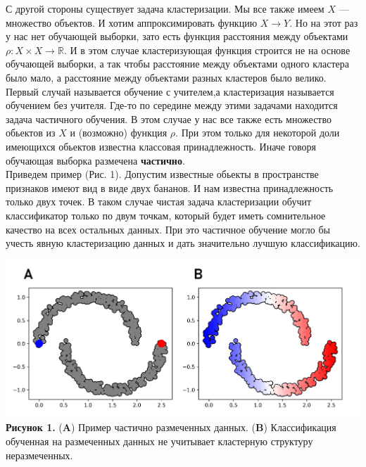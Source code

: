 С другой стороны существует задача кластеризации. Мы все также имеем $X$ --- множество объектов. И хотим аппроксимировать функцию $X \longrightarrow Y$. Но на этот раз у нас нет обучающей выборки, зато есть функция расстояния между объектами $\rho: X\times X \longrightarrow \mathbb{R}$. И в этом случае кластеризующая функция строится не на основе обучающей выборки, а так чтобы расстояние между объектами одного кластера было мало, а расстояние между объектами разных кластеров было велико. \\

Первый случай называется обучение с учителем,а кластеризация называется обучением без учителя. Где-то по середине между этими задачами находится задача частичного обучения. В этом случае у нас все также есть множество обьектов из $X$ и (возможно) функция $\rho$. При этом только для некоторой доли имеющихся обьектов известна классовая принадлежность. Иначе говоря обучающая выборка размечена \textbf{частично}. \\

Приведем пример (Рис. 1). Допустим известные обьекты в пространстве признаков имеют вид в виде двух бананов. И нам известна принадлежность только двух точек. В таком случае чистая задача кластеризации обучит классификатор только по двум точкам, который будет иметь сомнительное качество на всех остальных данных. При это частичное обучение могло бы учесть явную кластеризацию данных и дать значительно лучшую классификацию.\\

\begin{center}
\includegraphics[width=1.0\textwidth]{picture_1.png}
\textbf{Рисунок 1.} (\textbf{A}) Пример частично размеченных данных. (\textbf{B}) Классификация обученная на размеченных данных не учитывает кластерную структуру неразмеченных. 
\end{center}

